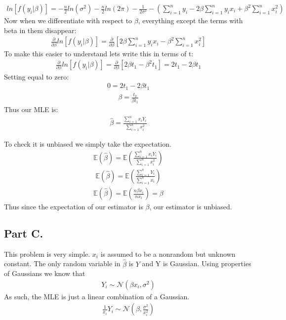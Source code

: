 \documentclass{article}
\begin{document}
\begin{align*}
ln[f(y_i|\beta)] = - \frac{n}{2} ln(\sigma^2) - \frac{n}{2} ln(2 \pi) - \frac{1}{2\sigma^2} - (\sum_{i=1}^{n} y_i - 2\beta \sum_{i=1}^{n} y_i x_i + \beta^2 \sum_{i=1}^{n} x_i^2)
\end{align*}
Now when we differentiate with respect to $\beta$, everything except the terms with beta in them disappear:
\begin{align*}
\frac{\partial}{\partial \beta} ln[f(y_i|\beta)] = \frac{\partial}{\partial \beta}[ 2\beta \sum_{i=1}^{n} y_i x_i - \beta^2 \sum_{i=1}^{n} x_i^2 ]
\end{align*}
To make this easier to understand lets write this in terms of t:
\begin{align*}
\frac{\partial}{\partial \beta} ln[f(y_i|\beta)] = \frac{\partial}{\partial \beta}[ 2\beta t_1 - \beta^2 t_1 ] = 2 t_1 - 2 \beta t_1
\end{align*}
Setting equal to zero:
\begin{align*}
0 = 2 t_1 - 2 \beta t_1
\end{align*}
\begin{align*}
\beta = \frac{t_2}{\beta t_1}
\end{align*}
Thus our MLE is:
\begin{align*}
\hat{\beta} = \frac{\sum_{i=1}^{n} x_i Y_i}{\sum_{i=1}^{n} x_i^2}
\end{align*}

To check it is unbiased we simply take the expectation.
\begin{align*}
\mathbb{E}(\hat{\beta}) = \mathbb{E}(\frac{\sum_{i=1}^{n} x_i Y_i}{\sum_{i=1}^{n} x_i^2})
\end{align*}
\begin{align*}
\mathbb{E}(\hat{\beta}) = \mathbb{E}(\frac{\sum_{i=1}^{n} Y_i}{\sum_{i=1}^{n} x_i})
\end{align*}
\begin{align*}
\mathbb{E}(\hat{\beta}) = \mathbb{E}(\frac{n \beta x_i}{n x_i}) = \beta
\end{align*}
Thus since the expectation of our estimator is $\beta$, our estimator is unbiased.
\subsection*{Part C.}
This problem is very simple. $x_i$ is assumed to be a nonrandom but unknown constant. The only random variable in $\hat{\beta}$ is $Y$ and Y is Gaussian. Using properties of Gaussians we know that
\begin{align*}
Y_i \sim \mathcal{N}(\beta x_i, \sigma^2)
\end{align*}
As such, the MLE is just a linear combination of a Gaussian.
\begin{align*}
\frac{1}{x_i} Y_i \sim \mathcal{N}(\beta, \frac{\sigma^2}{x_i^2})
\end{align*}
\clearpage
\end{document}
